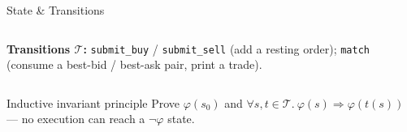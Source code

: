 \begin{frame}{State \& Transitions}
\begin{columns}[T]
\textbf{Transitions $\mathcal{T}$:} \texttt{submit\_buy} / \texttt{submit\_sell} (add a resting order); \texttt{match} (consume a best-bid / best-ask pair, print a trade).
\end{columns}

\vspace{2mm}

\begin{block}{Inductive invariant principle}
Prove $\varphi(s_0)$ and $\forall s, t \in \mathcal{T}.\ \varphi(s) \Rightarrow \varphi(t(s))$ --- no execution can reach a $\neg\varphi$ state.
\end{block}

\end{frame}
